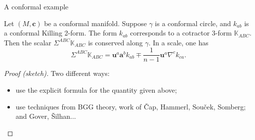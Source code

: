 \documentclass[handout]{beamer}
\begin{document}
\begin{frame}{A conformal example}
  \begin{Theorem}
    Let \( (M,\bm{c}) \) be a conformal manifold.
    Suppose \( \gamma \) is a conformal circle, and \( k_{ab} \) is a conformal
    Killing 2-form.
    The form \( k_{ab} \) corresponds to a cotractor 3-form \( \mathbb{K}_{ABC}
    \).
    Then the scalar \( \Sigma^{ABC} \mathbb{K}_{ABC} \) is conserved along \(
    \gamma \).
    In a scale, one has
    \[
      \Sigma^{ABC} \mathbb{K}_{ABC} = \mathbf{u}^a \mathbf{a}^b k_{ab} \mp \frac{1}{n-1} \mathbf{u}^a \nabla^c k_{ca}.
    \]
  \end{Theorem}
  \pause
  \begin{proof}[Proof (sketch)]
    Two different ways:
    \begin{itemize}
      \item use the explicit formula for the quantity given above;
      \item use techniques from BGG theory, work of \v{C}ap, Hammerl, Sou\v{c}ek, Somberg; and Gover, \v{S}ilhan...
    \end{itemize}
  \end{proof}
\end{frame}
\end{document}

